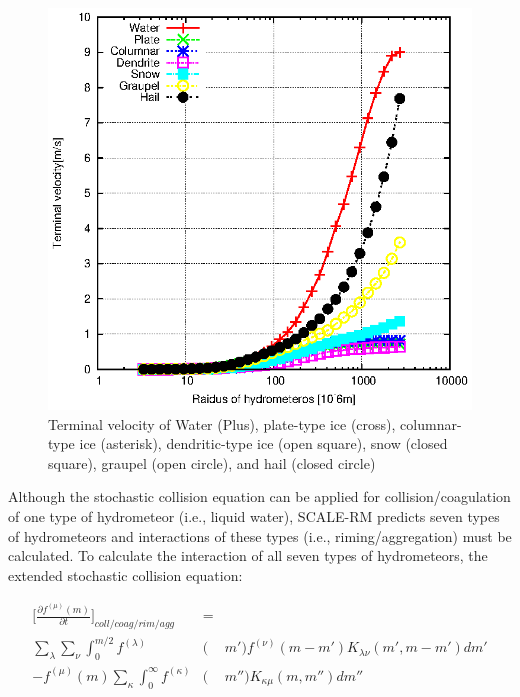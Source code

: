 \begin{figure}[ht]
\begin{center}
\includegraphics[scale=0.9]{./figure/terminal-velocity.eps}
\end{center}
\caption{Terminal velocity of Water (Plus), plate-type ice (cross), columnar-type ice (asterisk), dendritic-type ice (open square), snow (closed square), graupel (open circle), and hail (closed circle)}
\label{figs10-term}
\end{figure}


Although the stochastic collision equation can be applied for collision/coagulation of one type of hydrometeor (i.e., liquid water), SCALE-RM predicts seven types of hydrometeors and interactions of these types (i.e., riming/aggregation) must be calculated. To calculate the interaction of all seven types of hydrometeors, the extended stochastic collision equation:

\begin{eqnarray}
\Bigr[\frac{\partial f^{(\mu)}(m)}{\partial t}\Bigr]_{coll/coag/rim/agg}&=&\nonumber\\
\sum_{\lambda}\sum_{\nu}\int_{0}^{m/2}f^{(\lambda)}&(&m')f^{(\nu)}(m-m')K_{\lambda\nu}(m',m-m')dm' \nonumber\\
-f^{(\mu)}(m)\sum_{\kappa}\int_0^{\infty}f^{(\kappa)}&(&m'')K_{\kappa\mu}(m,m'')dm''\label{s10-16}
\end{eqnarray}

